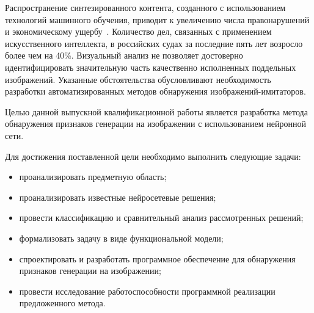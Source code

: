 
Распространение синтезированного контента, созданного с использованием технологий машинного обучения, приводит к увеличению числа правонарушений и экономическому ущербу~\cite{spb-uni}. Количество дел, связанных с применением искусственного интеллекта, в российских судах за последние пять лет возросло более чем на 40\%. Визуальный анализ не позволяет достоверно идентифицировать значительную часть качественно исполненных поддельных изображений. Указанные обстоятельства обусловливают необходимость разработки автоматизированных методов обнаружения изображений-имитаторов.

Целью данной выпускной квалификационной работы является разработка метода обнаружения признаков генерации на изображении с использованием нейронной сети.

Для достижения поставленной цели необходимо выполнить следующие задачи:
\begin{itemize}
	\item проанализировать предметную область;
	\item проанализировать известные нейросетевые решения;
	\item провести классификацию и сравнительный анализ рассмотренных решений;
	\item формализовать задачу в виде функциональной модели;
	\item спроектировать и разработать программное обеспечение для обнаружения признаков генерации на изображении;
	\item провести исследование работоспособности программной реализации предложенного метода.
\end{itemize}